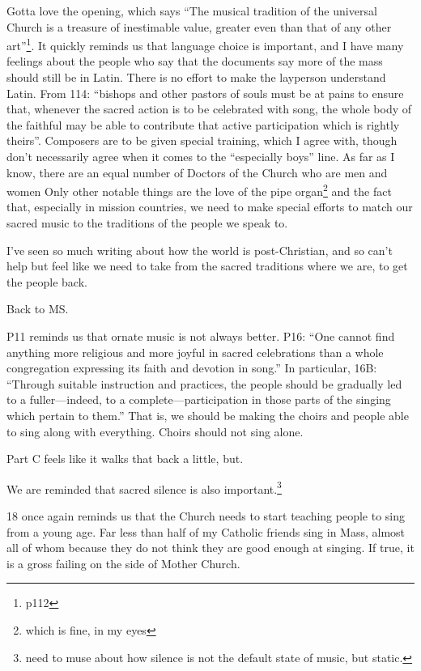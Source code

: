 \documentclass[12pt]{article}
\newcommand{\say}[1]{``#1''}
\renewcommand{\,}{\textsuperscript{,}}
\begin{document}
Gotta love the opening, which says \say{The musical tradition of the universal Church is a treasure of inestimable value, greater even than that of any other art}\footnote{p112}.  
It quickly reminds us that language choice is important, and I have many feelings about the people who say that the documents say more of the mass should still be in Latin.  
There is no effort to make the layperson understand Latin.  
From 114: \say{bishops and other pastors of souls must be at pains to
ensure that, whenever the sacred action is to be celebrated with song,
the whole body of the faithful may be able to contribute that active
participation which is rightly theirs}.  
Composers are to be given special training, which I agree with, though don't necessarily agree when it comes to the \say{especially boys} line.  
As far as I know, there are an equal number of Doctors of the Church who are men and women  
Only other notable things are the love of the pipe organ\footnote{which is fine, in my eyes} and the fact that, especially in mission countries, we need to make special efforts to match our sacred music to the traditions of the people we speak to.

I've seen so much writing about how the world is post-Christian, and so can't help but feel like we need to take from the sacred traditions where we are, to get the people back.

Back to MS.

P11 reminds us that ornate music is not always better.  
P16: \say{One cannot find anything more religious and more joyful in sacred
celebrations than a whole congregation expressing its faith and devotion
in song.}  
In particular, 16B: \say{Through suitable instruction and practices, the people should be gradually led to a fuller—indeed, to a complete—participation in those parts of the singing which pertain to them.}  
That is, we should be making the choirs and people able to sing along with everything.  
Choirs should not sing alone.

Part C feels like it walks that back a little, but.

We are reminded that sacred silence is also important.\footnote{need to muse about how silence is not the default state of music, but static.}

18 once again reminds us that the Church needs to start teaching people to sing from a young age.  
Far less than half of my Catholic friends sing in Mass, almost all of whom because they do not think they are good enough at singing.  
If true, it is a gross failing on the side of Mother Church.
\end{document}
